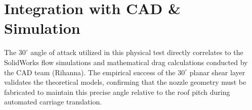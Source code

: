 \documentclass{article}
\begin{document}
\section{Integration with CAD \& Simulation}
The $30^\circ$ angle of attack utilized in this physical test directly correlates to the SolidWorks flow simulations and mathematical drag calculations conducted by the CAD team (Rihanna). The empirical success of the $30^\circ$ planar shear layer validates the theoretical models, confirming that the nozzle geometry must be fabricated to maintain this precise angle relative to the roof pitch during automated carriage translation.
\end{document}
